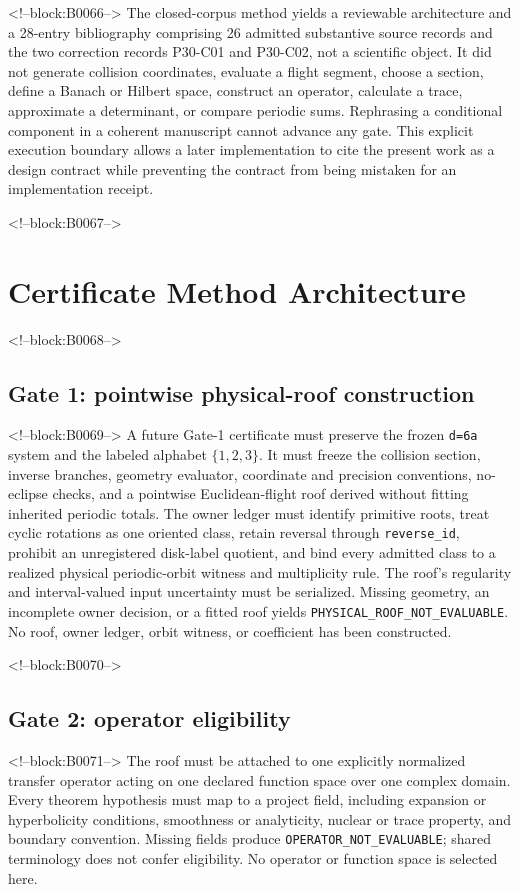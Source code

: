 \documentclass[11pt,a4paper]{article}
\begin{document}
<!--block:B0066-->
The closed-corpus method yields a reviewable architecture and a 28-entry bibliography comprising 26 admitted substantive source records and the two correction records P30-C01 and P30-C02, not a scientific object. It did not generate collision coordinates, evaluate a flight segment, choose a section, define a Banach or Hilbert space, construct an operator, calculate a trace, approximate a determinant, or compare periodic sums. Rephrasing a conditional component in a coherent manuscript cannot advance any gate. This explicit execution boundary allows a later implementation to cite the present work as a design contract while preventing the contract from being mistaken for an implementation receipt.

<!--block:B0067-->
\section{Certificate Method Architecture}

<!--block:B0068-->
\subsection{Gate 1: pointwise physical-roof construction}

<!--block:B0069-->
A future Gate-1 certificate must preserve the frozen \texttt{d=6a} system and the labeled alphabet \(\{1,2,3\}\). It must freeze the collision section, inverse branches, geometry evaluator, coordinate and precision conventions, no-eclipse checks, and a pointwise Euclidean-flight roof derived without fitting inherited periodic totals. The owner ledger must identify primitive roots, treat cyclic rotations as one oriented class, retain reversal through \texttt{reverse\_id}, prohibit an unregistered disk-label quotient, and bind every admitted class to a realized physical periodic-orbit witness and multiplicity rule. The roof's regularity and interval-valued input uncertainty must be serialized. Missing geometry, an incomplete owner decision, or a fitted roof yields \texttt{PHYSICAL\_ROOF\_NOT\_EVALUABLE}. No roof, owner ledger, orbit witness, or coefficient has been constructed.

<!--block:B0070-->
\subsection{Gate 2: operator eligibility}

<!--block:B0071-->
The roof must be attached to one explicitly normalized transfer operator acting on one declared function space over one complex domain. Every theorem hypothesis must map to a project field, including expansion or hyperbolicity conditions, smoothness or analyticity, nuclear or trace property, and boundary convention. Missing fields produce \texttt{OPERATOR\_NOT\_EVALUABLE}; shared terminology does not confer eligibility. No operator or function space is selected here.
\end{document}
